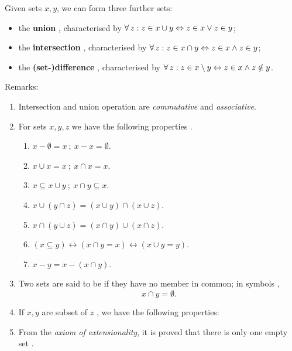 \documentclass[12pt]{book}
\begin{document}
Given sets $x, y$, we can form three further sets:
\begin{itemize}
      \item the \textbf{union} , characterised by $\fa\, z : z \in x \cup y \Lra z \in x \vee z \in y$;
      \item the \textbf{intersection} , characterised by $\fa\, z : z \in x \cap y \Lra z \in x \wedge z \in y$;
      \item the \textbf{(set-)difference} , characterised by $\fa\, z : z \in x \sm y \Lra z \in x \wedge z \notin y$.
\end{itemize}
Remarks:
\begin{enumerate}
      \item Intersection and union operation are {\it commutative} and {\it associative}.
      \item For sets $x, y, z$ we have the following properties \cite{h1}.
      \begin{enumerate}
            \item $x - \emptyset = x\ ;\ x - x = \emptyset $. 
            \item $x \cup x = x\ ;\ x \cap x = x $.
            \item $x \subseteq x \cup y\ ;\ x \cap y \subseteq x$.
            \item $x \cup (y \cap z) = (x \cup y) \cap (x \cup z)$.
            \item $x \cap (y \cup z) = (x \cap y) \cup (x \cap z)$.
            \item $(x \subseteq y) \leftrightarrow (x \cap y=x) \leftrightarrow (x \cup y = y)$.
            \item $x - y = x - (x \cap y)$.
      \end{enumerate}
      \item Two sets are said to be  if they have no member in common; in symbols \cite{h1},
      $$ x \cap y = \emptyset .$$
      \item If $x, y $ are subset of $z$ , we have the following properties:
      \begin{enumerate}
	        \item $z - ( z - x ) = x$;
	        \item $(x \subseteq y) \leftrightarrow [(z - y) \subseteq (z - x)]}$;
	        \item $x \cup (z - x) = z$;
	        \item $z - (x \cup y) = (z - x) \cap (z - y)$;
	        \item $z - (x \cap y) = (z - x) \cup (z - y)$.
	  \end{enumerate}
      \item From the {\it axiom of extensionality}, it is proved that there is only one empty set \cite{h1}.
\end{enumerate}
\end{document}
